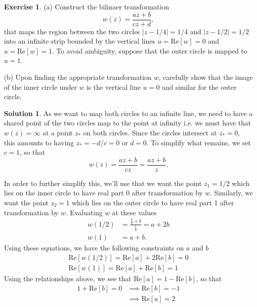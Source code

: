 \documentclass[12pt]{article}
\newcommand{\abs}[1]{ \left| #1 \right| }
\renewcommand{\Re}{\text{Re}}
\theoremstyle{definition}
\newtheorem{exer}{Exercise}
\newtheorem{sol}{Solution}
\theoremstyle{remark}
\begin{document}
\begin{exer}
    (a) Construct the bilinaer transformation
    \begin{equation*}
        w(z) = \frac{az+b}{cz+d},
    \end{equation*}
    that maps the region between the two circles $\abs{z- 1 / 4 } = 1 / 4$ and $\abs{z- 1 / 2} = 1 / 2$ into an infinite strip bounded by the vertical lines $u = \Re[w] = 0$ and $u = \Re[w] = 1$. To avoid ambiguity, suppose that the outer circle is mapped to $u=1$.

    (b) Upon finding the appropriate transformation $w$, carefully show that the image of the inner circle under $w$ is the vertical line $u=0$ and similar for the outer circle.
  \end{exer}
 
\begin{sol}\leavevmode
    As we want to map both circles to an infinite line, we need to have a shared point of the two circles map to the point at infinity i.e. we must have that $w(z) = \infty$ at a point $z_{*}$ on both circles. Since the circles intersect at $z_{*}=0$, this amounts to having $ z_{*} = - d / c = 0$ or $d = 0$. To simplify what remains, we set $c=1$, so that
    \begin{equation*}
        w(z) = \frac{az + b}{cz} = \frac{az+b}{z}. 
    \end{equation*}

    In order to further simplify this, we'll use that we want the point $z_1 =  1 / 2$ which lies on the inner circle to have real part 0 after transformation by $w$. Similarly, we want the point $z_{2} = 1$ which lies on the outer circle to have real part 1 after transformation by $w$. Evaluating $w$ at these values
    \begin{align*}
        w(1 / 2) &= \frac{\frac{a}{2} + b}{\frac{1}{2}} = a + 2b \\
        w(1) &= a + b.    
    \end{align*}
Using these equations, we have the following constraints on $a$ and $b$
\begin{align*}
    \Re[ w( 1 / 2 ) ] = \Re[a] + 2 \Re[b] = 0\\
    \Re[w (1)] = \Re[a] + \Re[b] = 1
\end{align*}
Using the relationships above, we see that $\Re[a] = 1 - \Re[b]$, so that
\begin{align*}
    1 + \Re[b] = 0 &\implies \Re[b] = -1 \\
                   &\implies \Re[a] = 2
\end{align*}


\end{sol}
\end{document}
